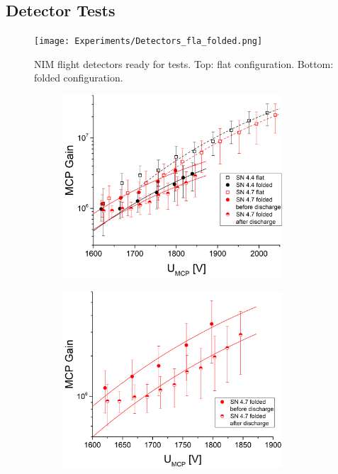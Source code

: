 	\subsection{Detector Tests }\label{chapExp:Det}
	
	\begin{figure}[h] %
		\centering
		\texttt{[image: Experiments/Detectors\_fla\_folded.png]}
		\caption{NIM flight detectors ready for tests. Top: flat configuration. Bottom: folded configuration.}
		\label{fig:DetFlatFolded}
	\end{figure}
	\begin{figure}[h!] %
	\begin{subfigure}{.5\textwidth}
		\centering
		\includegraphics[width=0.9\textwidth]{Experiments/Gain_Curves_SN4p5_4p7.png}
	\end{subfigure}
	\begin{subfigure}{.5\textwidth}
		\centering
		\includegraphics[width=0.9\textwidth]{Experiments/SN4p7_discharge.png}

\end{subfigure}
\end{figure}

